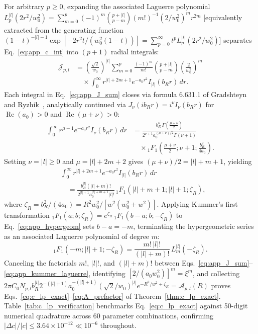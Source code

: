 \documentclass[aps,pra,onecolumn,notitlepage,11pt,tightenlines,amsmath,amssymb,floatfix,longbibliography]{revtex4-2}
\providecommand{\abs}[1]{\lvert#1\rvert}
\begin{document}
For arbitrary $p \ge 0$, expanding the associated Laguerre polynomial $L_p^{\abs{l}}(2r^2/w_0^2) = \sum_{m=0}^p (-1)^m \allowbreak \binom{p+\abs{l}}{p-m} \allowbreak (m!)^{-1} \allowbreak (2/w_0^2)^m r^{2m}$ [equivalently extracted from the generating function $(1-t)^{-\abs{l}-1}\allowbreak \exp[-2r^2 t/(w_0^2(1-t))] = \sum_{p=0}^\infty t^p L_p^{\abs{l}}(2r^2/w_0^2)$] separates Eq.~\eqref{eq:app_c_int} into $(p+1)$ radial integrals:
\begin{align}
\mathcal{J}_{p,l} &= \left(\frac{\sqrt{2}}{w_0}\right)^{\abs{l}} \sum_{m=0}^p \frac{(-1)^m}{m!}\binom{p+\abs{l}}{p-m}\left(\frac{2}{w_0^2}\right)^m \nonumber \\
&\quad \times \int_0^\infty r^{\abs{l}+2m+1} e^{-a_0 r^2} I_{\abs{l}}(b_R r)\,dr.
\label{eq:app_J_sum}
\end{align}
Each integral in Eq.~\eqref{eq:app_J_sum} closes via formula 6.631.1 of Gradshteyn and Ryzhik~\cite{Gradshteyn2014}, analytically continued via $J_\nu(i b_R r) = i^\nu I_\nu(b_R r)$ for $\operatorname{Re}(a_0) > 0$ and $\operatorname{Re}(\mu+\nu) > 0$:
\begin{align*}
\int_0^\infty r^{\mu-1} e^{-a_0 r^2} I_\nu(b_R r)\,dr &= \frac{b_R^\nu\,\Gamma\!\left(\frac{\mu+\nu}{2}\right)}{2^{\nu+1} a_0^{(\mu+\nu)/2}\Gamma(\nu+1)} \\
&\quad \times {_1F_1}\!\left(\frac{\mu+\nu}{2}; \nu+1; \frac{b_R^2}{4a_0}\right).
\end{align*}
Setting $\nu = \abs{l} \ge 0$ and $\mu = \abs{l} + 2m + 2$ gives $(\mu+\nu)/2 = \abs{l} + m + 1$, yielding
\begin{align}
&\int_0^\infty r^{\abs{l}+2m+1} e^{-a_0 r^2} I_{\abs{l}}(b_R r)\,dr \nonumber \\
&\quad = \frac{b_R^{\abs{l}}(\abs{l}+m)!}{2^{\abs{l}+1} a_0^{\abs{l}+m+1}\abs{l}!}\,{_1F_1}\!\left(\abs{l}+m+1; \abs{l}+1; \zeta_R\right),
\label{eq:app_hypergeom}
\end{align}
where $\zeta_R = b_R^2/(4a_0) = R^2 w_0^2/[w^2(w_0^2+w^2)]$. Applying Kummer's first transformation ${_1F_1}(a;b;\zeta_R) = e^{\zeta_R}\,{_1F_1}(b-a;b;-\zeta_R)$ to Eq.~\eqref{eq:app_hypergeom} sets $b - a = -m$, terminating the hypergeometric series as an associated Laguerre polynomial of degree $m$:
\begin{equation}
{_1F_1}\!\left(-m; \abs{l}+1; -\zeta_R\right) = \frac{m!\,\abs{l}!}{(\abs{l}+m)!}\,L_m^{\abs{l}}(-\zeta_R).
\label{eq:app_kummer_laguerre}
\end{equation}
Canceling the factorials $m!$, $\abs{l}!$, and $(\abs{l}+m)!$ between Eqs.~\eqref{eq:app_J_sum}--\eqref{eq:app_kummer_laguerre}, identifying $[2/(a_0 w_0^2)]^m = \xi^m$, and collecting $2\pi C_0 N_{p,l} b_R^{\abs{l}} 2^{-(\abs{l}+1)} a_0^{-(\abs{l}+1)} (\sqrt{2}/w_0)^{\abs{l}} e^{-R^2/w^2 + \zeta_R} = \mathcal{A}_{p,l}(R)$ proves Eqs.~\eqref{eq:c_lp_exact}--\eqref{eq:A_prefactor} of Theorem~\ref{thm:c_lp_exact}. Table~\ref{tab:c_lp_verification} benchmarks Eq.~\eqref{eq:c_lp_exact} against 50-digit numerical quadrature across 60 parameter combinations, confirming $\abs{\Delta c}/\abs{c} \le 3.64\times 10^{-12} \ll 10^{-6}$ throughout.
\end{document}
